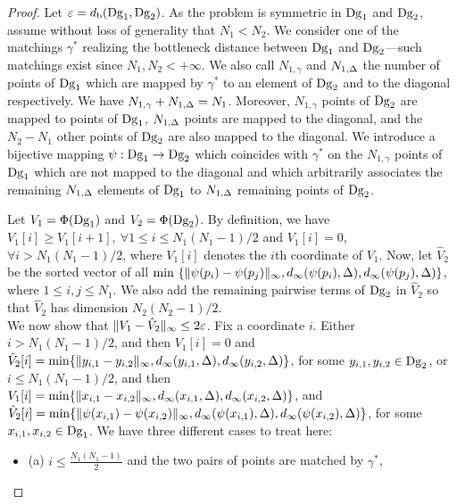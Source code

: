 \begin{proof}
Let $\varepsilon=d_{\rm b}(\mathrm{Dg}_1,\mathrm{Dg}_2)$.
As the problem is symmetric in $\mathrm{Dg}_1$ and $\mathrm{Dg}_2$, 
assume without loss of generality that $N_1<N_2$. 
We consider one of the matchings $\gamma^*$ 
realizing the bottleneck distance between $\mathrm{Dg}_1$ and $\mathrm{Dg}_2$---such matchings exist since
$N_1,N_2<+\infty$. 
We also call $N_{1,\gamma}$ and $N_{1,\Delta}$ the number of points of $\mathrm{Dg}_1$ 
which are mapped by $\gamma^*$ to an element 
of $\mathrm{Dg}_2$ and to the diagonal respectively. We have $N_{1,\gamma}+N_{1,\Delta}=N_1$. 
Moreover, $N_{1,\gamma}$ points of $\mathrm{Dg}_2$ are mapped to points of $\mathrm{Dg}_1$,
$N_{1,\Delta}$ points are mapped to the diagonal, and the $N_2-N_1$ other points of $\mathrm{Dg}_2$ 
are also mapped to the diagonal. 
We introduce a bijective mapping 
$\psi:\mathrm{Dg}_1\rightarrow\mathrm{Dg}_2$ which coincides with $\gamma^*$ 
on the $N_{1,\gamma}$ points of $\mathrm{Dg}_1$ which are not mapped to the diagonal  
and which arbitrarily associates the remaining $N_{1,\Delta}$ elements of 
$\mathrm{Dg}_1$ to  $N_{1,\Delta}$ remaining  points of $\mathrm{Dg}_2$. 

Let $V_1=\Phi(\mathrm{Dg}_1)$ and $V_2=\Phi(\mathrm{Dg}_2)$.
By definition, we have 
$V_1[i]\geq V_1[i+1],\ \forall 1\leq i \leq N_1(N_1-1)/2$ and $V_1[i]=0$, $\forall i>N_1(N_1-1)/2$,
where $V_1[i]$ denotes the $i$th coordinate of $V_1$.
Now, let $\hat{V}_2$ be the sorted vector of all
$\min\ \{\|\psi(p_i)-\psi(p_j)\|_\infty,d_\infty(\psi(p_i),\Diag),d_\infty(\psi(p_j),\Diag)\}$,
where $1\leq i,j\leq N_1$.
We also add the remaining pairwise terms of $\mathrm{Dg}_2$ in $\hat{V}_2$ 
so that $\hat V_2$ has dimension $N_2(N_2-1)/2$. \\

We now show that $\|V_1-\hat{V}_2\|_\infty\leq 2\varepsilon$.
Fix a coordinate $i$. Either $i>N_1(N_1-1)/2$, and then
$V_1[i]=0$ and $\hat{V}_2[i]=\min\{\|y_{i,1}-y_{i,2}\|_\infty,d_\infty(y_{i,1},\Delta),d_\infty(y_{i,2},\Delta)\}$, 
for some $y_{i,1},y_{i,2}\in\mathrm{Dg}_2$, or  $i\leq N_1(N_1-1)/2$, and then 
$V_1[i]=\min\{\|x_{i,1}-x_{i,2}\|_\infty,d_\infty(x_{i,1},\Delta),d_\infty(x_{i,2},\Delta)\}$, 
and $\hat{V}_2[i]=\min\{\|\psi(x_{i,1})-\psi(x_{i,2})\|_\infty,d_\infty(\psi(x_{i,1}),\Delta),d_\infty(\psi(x_{i,2}),\Delta)\}$,
for some $x_{i,1},x_{i,2}\in\mathrm{Dg}_1$. 
We have three different cases to treat here:
\begin{itemize}
\item (a) $i\leq \frac{N_1(N_1-1)}{2}$ and the two pairs of points are matched by $\gamma^*$,


\end{itemize}
\end{proof}
